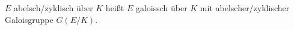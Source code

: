 \begin{note}
	$E$ abelsch/zyklisch über $K$ heißt $E$ galoissch über $K$ mit abelscher/zyklischer Galoisgruppe $G(E/K)$.
\end{note}
%
%
%
%
%
%
%
%
%





